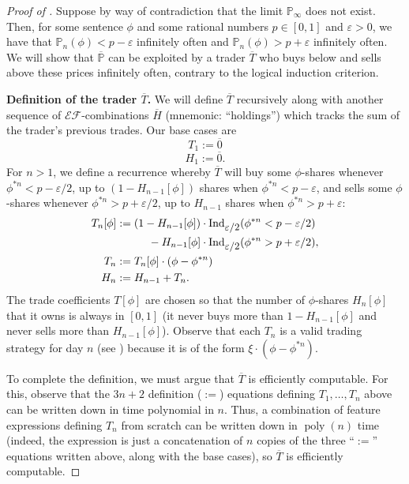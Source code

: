 \documentclass[authordate,onecolumn,noenvironments]{miri-tech-article}
\numberwithin{equation}{subsection}
\newcommand{\seq}[1]{{\overline{#1}}}
\newcommand{\poly}{\operatorname{poly}}
\newcommand{\exf}{\xi}
\newcommand{\nn}{n}
\newcommand{\tinysection}[1]{\medskip\noindent\textbf{#1.}}
\newcommand{\exfeatures}{\mathcal{E\!F}} %
\newcommand{\trade}{T}%
\newcommand{\Trader}{\seq{\trade}} %
\newcommand{\strat}{T} %
\newcommand{\hold}{H}
\newcommand{\EF}{\exfeatures}
\newcommand{\BelState}{\mathbb{P}}
\newcommand{\pf}[2][\nn]{{#2}^{*#1}}
\newcommand{\pt}{\BelState}
\newcommand{\MP}{\seq{\pt}}
\newcommand{\ctsind}[1]{\operatorname{Ind}_{\text{\small{${#1}$}}}} %
\begin{document}
\begin{proof}[Proof of ]
  Suppose by way of contradiction that the limit $\pt_\infty$ does not exist. Then, for some sentence $\phi$ and some rational numbers
  $p\in [0, 1]$ and $\varepsilon > 0$, we have that $\pt_\nn(\phi) < p-\varepsilon$ infinitely often and $\pt_\nn(\phi) > p+\varepsilon$  infinitely often. We will show that $\MP$ can be exploited by a trader $\Trader$ who buys below and sells above these prices infinitely often,  contrary to the logical induction criterion. 

  \tinysection{Definition of the trader $\Trader$} We will define $\Trader$ recursively along with another sequence of $\EF$-combinations $\seq\hold$ (mnemonic: ``holdings'') which tracks the sum of the trader's previous trades.  Our base cases are 
  \[\strat_1 := \overline{0}\]
  \[\hold_1:=\overline{0} .\] 
  For $n>1$, we define a recurrence whereby $\Trader$ will buy some $\phi$-shares whenever $\pf{\phi} < p-\varepsilon/2$, up to  $(1-\hold_{\nn-1}[\phi])$ shares when $\pf{\phi} < p-\varepsilon$, and sells some $\phi$-shares whenever $\pf{\phi} > p+\varepsilon/2$, up to $\hold_{n-1}$ shares when $\pf{\phi} > p+\varepsilon$:
  \begin{equation}\label{eq:convergencetn}
    \begin{aligned}
      \strat_\nn[\phi] &:= (1-\hold_{\nn-1}[\phi]) \cdot \ctsind{\varepsilon/2}( \pf{\phi}< p-\varepsilon/2)\\
      &\hphantom{\; := (1)  } - \hold_{\nn-1}[\phi] \cdot \ctsind{\varepsilon/2}( \pf{\phi}> p+\varepsilon/2),\\
      \strat_\nn &:= \strat_\nn[\phi] \cdot(\phi - \pf{\phi})\\
      \hold_\nn &:= \hold_{n-1} + \strat_\nn .
    \end{aligned}
\end{equation}
  The trade coefficients $\strat[\phi]$ are chosen so that the number of $\phi$-shares $\hold_\nn[\phi]$ that it owns is always in $[0,1]$ (it never buys more than $1-\hold_{\nn-1}[\phi]$ and never sells more than $\hold_{\nn-1}[\phi]$).
  Observe that each $\strat_\nn$ is a valid trading strategy for day $\nn$ (see ) because it is of the form $\exf\cdot(\phi-\pf\phi)$.  

  To complete the definition, we must argue that $\Trader$ is efficiently computable.  For this, observe that the $3\nn+2$ definition ($:=$) equations defining $\strat_1,\ldots,\strat_\nn$ above can be written down in time polynomial in $\nn$. Thus, a combination of feature expressions defining $\strat_\nn$ from scratch can be written down in $\poly(\nn)$ time (indeed, the expression is just a concatenation of $\nn$ copies of the three ``$:=$'' equations written above, along with the base cases), so $\seq\strat$ is efficiently computable.


\end{proof}
\end{document}
